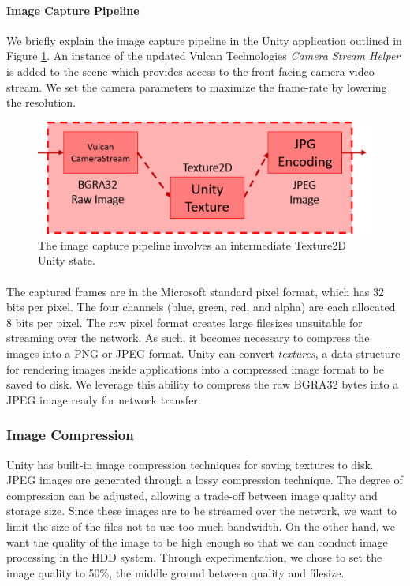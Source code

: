 \paragraph{Image Capture Pipeline} We briefly explain the image capture pipeline in the Unity application outlined in Figure \ref{fig:imgProcPipeline}. An instance of the updated Vulcan Technologies \textit{Camera Stream Helper} is added to the scene which provides access to the front facing camera video stream. We set the camera parameters to maximize the frame-rate by lowering the resolution. 

\begin{figure}[ht]
    \centering
    \includegraphics[width=0.6\linewidth]{img/chapter5_implementation/imageCapturePipeline.png}
    \caption{The image capture pipeline involves an intermediate Texture2D Unity state.}
    \label{fig:imgProcPipeline}
\end{figure}

\paragraph{} The captured frames are in the Microsoft standard  pixel format, which has 32 bits per pixel. The four channels (blue, green, red, and alpha) are each allocated 8 bits per pixel. The raw pixel format creates large filesizes unsuitable for streaming over the network. As such, it becomes necessary to compress the images into a PNG or JPEG format. Unity can convert \textit{textures}, a data structure for rendering images inside applications into a compressed image format to be saved to disk. We leverage this ability to compress the raw BGRA32 bytes into a JPEG image ready for network transfer.

\subsubsection{Image Compression}
Unity has built-in image compression techniques for saving textures to disk. JPEG images are generated through a lossy compression technique. The degree of compression can be adjusted, allowing a trade-off between image quality and storage size. Since these images are to be streamed over the network, we want to limit the size of the files not to use too much bandwidth. On the other hand, we want the quality of the image to be high enough so that we can conduct image processing in the HDD system. Through experimentation, we chose to set the image quality to 50\%, the middle ground between quality and filesize.


